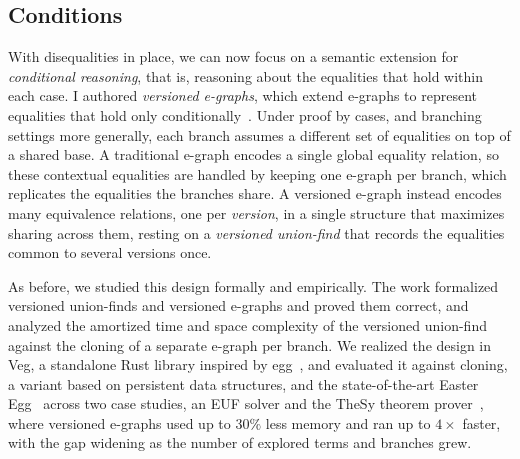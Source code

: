 \subsection{Conditions}
With disequalities in place, we can now focus on a semantic extension for
\textit{conditional reasoning}, that is, reasoning about the equalities that
hold within each case.
I authored \textit{versioned e-graphs}, which extend e-graphs to represent
equalities that hold only conditionally~\cite{cesario2026versioned}.
Under proof by cases, and branching settings more generally, each branch assumes
a different set of equalities on top of a shared base. A traditional e-graph
encodes a single global equality relation, so these contextual equalities are
handled by keeping one e-graph per branch, which replicates the equalities the
branches share. A versioned e-graph instead encodes many equivalence relations, one
per \textit{version}, in a single structure that maximizes sharing across them,
resting on a \textit{versioned union-find} that records the equalities common to
several versions once.

As before, we studied this design formally and empirically. The work formalized
versioned union-finds and versioned e-graphs and proved them correct, and
analyzed the amortized time and space complexity of the versioned union-find
against the cloning of a separate e-graph per branch. We realized the design in
Veg, a standalone Rust library inspired by egg~\cite{willsey2021egg}, and
evaluated it against cloning, a variant based on persistent data structures, and
the state-of-the-art Easter Egg~\cite{singher2024easteregg} across two case
studies, an EUF
solver and the TheSy theorem prover~\cite{singher2021thesy}, where versioned
e-graphs used up to $30\%$ less memory and ran up to $4\times$ faster, with the
gap widening as the number of explored terms and branches grew.